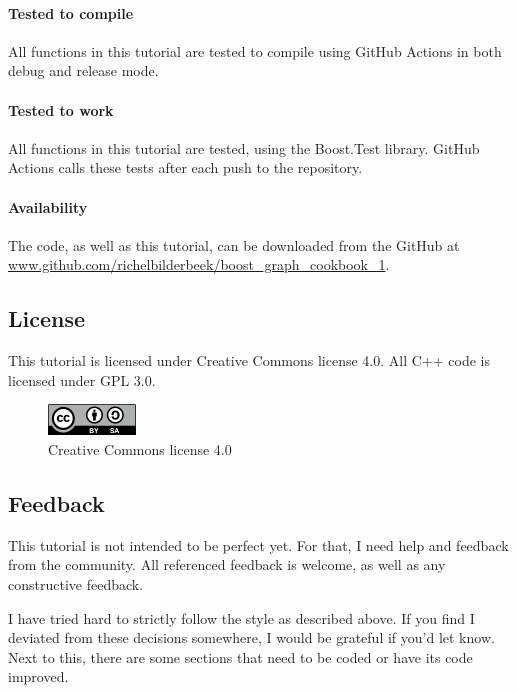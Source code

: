 \paragraph{Tested to compile}

All functions in this tutorial are tested to compile using GitHub Actions in
both debug and release mode.

\paragraph{Tested to work}

All functions in this tutorial are tested, using the Boost.Test library.
GitHub Actions calls these tests after each push to the repository.

\paragraph{Availability}

The code, as well as this tutorial, can be downloaded from the GitHub at
\url{www.github.com/richelbilderbeek/boost_graph_cookbook_1}.

\subsection{License}

This tutorial is licensed under Creative Commons license 4.0.
All C++ code is licensed under GPL 3.0.

\begin{figure}[!htbp]
  \includegraphics[]{CC-BY-SA_icon.png}
  \caption{
    Creative Commons license 4.0
  }
  \label{fig:license}
\end{figure}

\subsection{Feedback}

This tutorial is not intended to be perfect yet.
For that, I need help and feedback from the community.
All referenced feedback is welcome, as well as any constructive feedback.

I have tried hard to strictly follow the style as described above.
If you find I deviated from these decisions somewhere, I would be grateful
if you'd let know.
Next to this, there are some sections that need to be coded or have its
code improved.

